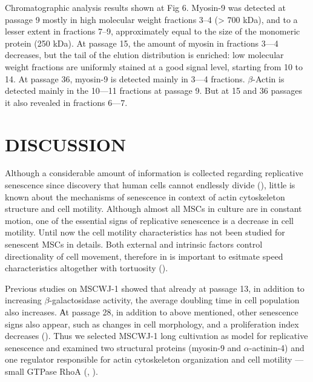 \documentclass[alpha-refs]{wiley-article}
\begin{document}
Chromatographic analysis results shown at Fig 6.
Myosin-9 was detected at passage 9 mostly in high molecular weight fractions 3--4 (> 700 kDa), and to a lesser extent in fractions 7--9, approximately equal to the size of the monomeric protein (250 kDa).
At passage 15, the amount of myosin in fractions 3–--4 decreases, but the tail of the elution distribution is enriched: low molecular weight fractions are uniformly stained at a good signal level, starting from 10 to 14.
At passage 36, myosin-9 is detected mainly in 3---4 fractions.
$\beta$-Actin is detected mainly in the 10---11 fractions at passage 9.
But at 15 and 36 passages it also revealed in fractions 6---7.

\section{DISCUSSION}

Although a considerable amount of information is collected regarding replicative senescence since discovery that human cells cannot endlessly divide (\cite{hayflick1961serial}), little is known about the mechanisms of senescence in context of actin cytoskeleton structure and cell motility.
Although almost all MSCs in culture are in constant motion, one of the essential signs of replicative senescence is a decrease in cell motility.
Until now the cell motility characteristics has not been studied for senescent MSCs in details.
Both external and intrinsic factors control directionality of cell movement, therefore in is important to esitmate speed characteristics altogether with tortuosity (\cite{tiurin2013molecular}).

Previous studies on MSCWJ-1 showed that already at passage 13, in addition to increasing $\beta$-galactosidase activity, the average doubling time in cell population also increases.
Аt passage 28, in addition to above mentioned, other senescence signs also appear, such as changes in cell morphology, and a proliferation index decreases (\cite{koltsova2018dynamics}). Thus we selected MSCWJ-1  long cultivation as model for replicative senescence and examined two structural proteins (myosin-9 and $\alpha$-actinin-4) and one regulator responsible for actin cytoskeleton organization and cell motility --- small GTPase RhoA (\cite{wang2003regulation}, \cite{elliott2015myosin}).
\end{document}
